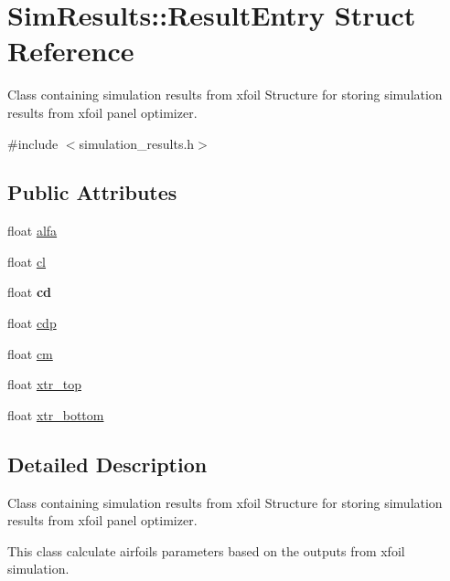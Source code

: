 \hypertarget{struct_sim_results_1_1_result_entry}{}\section{Sim\+Results\+:\+:Result\+Entry Struct Reference}
\label{struct_sim_results_1_1_result_entry}


Class containing simulation results from xfoil Structure for storing simulation results from xfoil panel optimizer.  




{\ttfamily \#include $<$simulation\+\_\+results.\+h$>$}

\subsection*{Public Attributes}
\begin{DoxyCompactItemize}
\item 
float \hyperlink{struct_sim_results_1_1_result_entry_aeebdc22ea1d6227bc7bb734b772cdde4}{alfa}
\item 
float \hyperlink{struct_sim_results_1_1_result_entry_afab2cac74d2206faeb9a590eb9accf65}{cl}
\item 
\mbox{\label{struct_sim_results_1_1_result_entry_a2eb610ab85a129e1b4dd1a7c23780a9b}} 
float {\bfseries cd}
\item 
float \hyperlink{struct_sim_results_1_1_result_entry_a908f88a569d107f81ea9b2182e4046be}{cdp}
\item 
float \hyperlink{struct_sim_results_1_1_result_entry_af2e79ccca64b400a53ff4c05319150da}{cm}
\item 
float \hyperlink{struct_sim_results_1_1_result_entry_a78de4c9c6ccbf398eb0cdc6d4a85e479}{xtr\+\_\+top}
\item 
float \hyperlink{struct_sim_results_1_1_result_entry_afc790d71044cb3d5f0fa9a02521c0b21}{xtr\+\_\+bottom}
\end{DoxyCompactItemize}


\subsection{Detailed Description}
Class containing simulation results from xfoil Structure for storing simulation results from xfoil panel optimizer. 

This class calculate airfoil\textquotesingle{}s parameters based on the outputs from xfoil simulation. 

